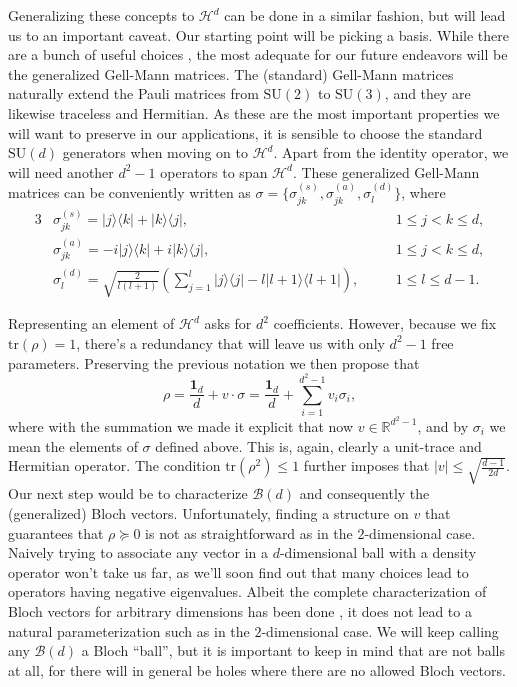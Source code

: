 		Generalizing these concepts to $\mathcal{H}^d$ can be done in a similar fashion, but will lead us to an important caveat. Our starting point will be picking a basis. While there are a bunch of useful choices \cite{bertlmann_2008_bloch}, the most adequate for our future endeavors will be the generalized Gell-Mann matrices. The (standard) Gell-Mann matrices naturally extend the Pauli matrices from $\text{SU}(2)$ to $\text{SU}(3)$, and they are likewise traceless and Hermitian. As these are the most important properties we will want to preserve in our applications, it is sensible to choose the standard $\text{SU}(d)$ generators when moving on to $\mathcal{H}^d$. Apart from the identity operator, we will need another $d^2 - 1$ operators to span $\mathcal{H}^d$. These generalized Gell-Mann matrices can be conveniently written as $\sigma = \{ \sigma^{(s)}_{jk}, \sigma^{(a)}_{jk}, \sigma^{(d)}_l \}$, where
		\begin{alignat*}{3}
			&\sigma^{(s)}_{jk} = \lvert j \rangle \langle k \rvert + \lvert k \rangle \langle j \rvert, \quad &&1 \leq j < k \leq d, \\
			&\sigma^{(a)}_{jk} = -i\lvert j \rangle \langle k \rvert + i\lvert k \rangle \langle j \rvert, \quad &&1 \leq j < k \leq d, \\
			&\sigma^{(d)}_{l} = \sqrt{\frac{2}{l (l+1)}} \left( \sum_{j=1}^l \lvert j \rangle \langle j \rvert - l\lvert l + 1 \rangle \langle l + 1 \rvert \right), \quad &&1 \leq l \leq d - 1 .
		\end{alignat*}

		Representing an element of $\mathcal{H}^d$ asks for $d^2$ coefficients. However, because we fix $\text{tr}(\rho) = 1$, there's a redundancy that will leave us with only $d^2 - 1$ free parameters. Preserving the previous notation we then propose that
		\begin{equation}
			\rho = \frac{\mathbf{1}_d}{d} + v \cdot \sigma = \frac{\mathbf{1}_d}{d} + \sum_{i = 1}^{d^2 - 1} v_i \sigma_i ,
			\label{eq:gell-mann-representation}
		\end{equation}
		where with the summation we made it explicit that now $v \in \mathbb{R}^{d^2 - 1}$, and by $\sigma_i$ we mean the elements of $\sigma$ defined above. This is, again, clearly a unit-trace and Hermitian operator. The condition $\text{tr}(\rho^2) \leq 1$ further imposes that $\lvert v \rvert \leq \sqrt{\frac{d - 1}{2d}}$. Our next step would be to characterize $\mathcal{B}(d)$ and consequently the (generalized) Bloch vectors. Unfortunately, finding a structure on $v$ that guarantees that $\rho \succeq 0$ is not as straightforward as in the $2$-dimensional case. Naively trying to associate any vector in a $d$-dimensional ball with a density operator won't take us far, as we'll soon find out that many choices lead to operators having negative eigenvalues. Albeit the complete characterization of Bloch vectors for arbitrary dimensions has been done \cite{kimura_2003_bloch}, it does not lead to a natural parameterization such as in the $2$-dimensional case. We will keep calling any $\mathcal{B}(d)$ a Bloch ``ball'', but it is important to keep in mind that are not balls at all, for there will in general be holes where there are no allowed Bloch vectors.

